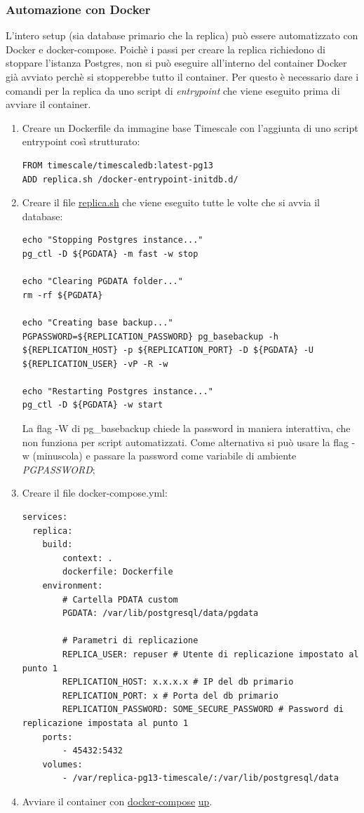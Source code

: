 \subsubsection{Automazione con Docker}
L'intero setup (sia database primario che la replica) può essere automatizzato con Docker e docker-compose.
Poichè i passi per creare la replica richiedono di stoppare l'istanza Postgres, non si può eseguire all'interno del container Docker già avviato perchè si stopperebbe tutto il container.
Per questo è necessario dare i comandi per la replica da uno script di \textit{entrypoint} che viene eseguito prima di avviare il container.
\begin{enumerate}
  \item Creare un Dockerfile da immagine base Timescale con l'aggiunta di uno script entrypoint così strutturato:
  \vspace{1mm}
  \begin{lstlisting}[]
FROM timescale/timescaledb:latest-pg13
ADD replica.sh /docker-entrypoint-initdb.d/
\end{lstlisting}
  \item Creare il file \url{replica.sh} che viene eseguito tutte le volte che si avvia il database:
  \vspace{1mm}
  \begin{lstlisting}[]
echo "Stopping Postgres instance..." 
pg_ctl -D ${PGDATA} -m fast -w stop

echo "Clearing PGDATA folder..." 
rm -rf ${PGDATA}

echo "Creating base backup..." 
PGPASSWORD=${REPLICATION_PASSWORD} pg_basebackup -h ${REPLICATION_HOST} -p ${REPLICATION_PORT} -D ${PGDATA} -U ${REPLICATION_USER} -vP -R -w

echo "Restarting Postgres instance..." 
pg_ctl -D ${PGDATA} -w start
\end{lstlisting}
La flag -W di pg\_basebackup chiede la password in maniera interattiva, che non funziona per script automatizzati. Come alternativa si può usare la flag -w (minuscola) e passare la password come variabile di ambiente \textit{PGPASSWORD};
\item Creare il file docker-compose.yml:
\vspace{1mm}
  \begin{lstlisting}[]
services:
  replica:
    build:
        context: .
        dockerfile: Dockerfile
    environment:
        # Cartella PDATA custom
        PGDATA: /var/lib/postgresql/data/pgdata

        # Parametri di replicazione
        REPLICA_USER: repuser # Utente di replicazione impostato al punto 1
        REPLICATION_HOST: x.x.x.x # IP del db primario
        REPLICATION_PORT: x # Porta del db primario
        REPLICATION_PASSWORD: SOME_SECURE_PASSWORD # Password di replicazione impostata al punto 1
    ports:
        - 45432:5432
    volumes:
        - /var/replica-pg13-timescale/:/var/lib/postgresql/data
\end{lstlisting}

  \item Avviare il container con \url{docker-compose} \url{up}.
\end{enumerate}

